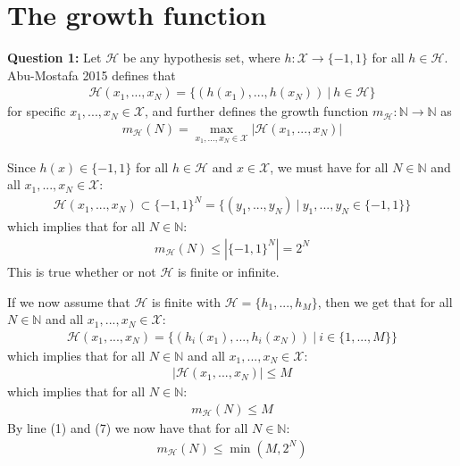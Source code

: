 \documentclass[12pt]{article}
\begin{document}
\section{The growth function}



\textbf{Question 1:} Let $\mathcal{H}$ be any hypothesis set, where $h:\mathcal{X}\to \{-1,1\}$ for all $h\in \mathcal{H}$. Abu-Mostafa 2015 defines that
\begin{align}
\mathcal{H}(x_1,...,x_N) = \{(h(x_1),...,h(x_N))\ |\ h\in \mathcal{H}\}
\end{align}
for specific $x_1,...,x_N \in \mathcal{X}$, and further defines the growth function $m_\mathcal{H}:\mathbb{N}\to \mathbb{N}$ as
\begin{align}
m_\mathcal{H}(N) = \max_{x_1,...,x_N \in \mathcal{X}} |\mathcal{H}(x_1,...,x_N)|
\end{align}

Since $h(x)\in\{-1,1 \}$ for all $h\in \mathcal{H}$ and $x\in \mathcal{X}$, we must have for all $N\in \mathbb{N}$ and all $x_1,...,x_N \in \mathcal{X}$:
\begin{align}
\mathcal{H}(x_1,...,x_N) \subset \{-1,1 \}^N = \{(y_1,...,y_N)\ |\ y_1,...,y_N \in \{-1, 1 \} \}
\end{align}
which implies that for all $N\in \mathbb{N}$:
\begin{align}
m_\mathcal{H}(N) \leq |\{-1,1 \}^N | = 2^N 
\end{align}
This is true whether or not $\mathcal{H}$ is finite or infinite. 

If we now assume that $\mathcal{H}$ is finite with $\mathcal{H} = \{h_1,...,h_M\}$, then we get that for all $N\in \mathbb{N}$ and all $x_1,...,x_N \in \mathcal{X}$:
\begin{align}
\mathcal{H}(x_1,...,x_N) = \{(h_i(x_1),...,h_i(x_N))\ |\ i\in \{1,...,M \}\}
\end{align}
which implies that for all $N\in \mathbb{N}$ and all $x_1,...,x_N \in \mathcal{X}$:
\begin{align}
|\mathcal{H}(x_1,...,x_N)| \leq M
\end{align}
which implies that for all $N\in \mathbb{N}$:
\begin{align}
m_\mathcal{H}(N) \leq M 
\end{align}
By line (1) and (7) we now have that for all $N\in \mathbb{N}$:
\begin{align}
m_\mathcal{H}(N) \leq \min (M,2^N)
\end{align}
\end{document}
